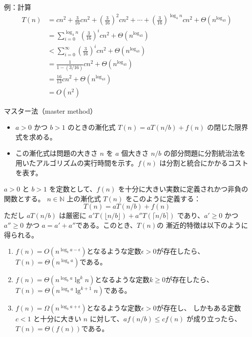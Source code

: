 \documentclass[unicode,11pt,aspectratio=169,notes]{beamer} %
\begin{document}
\begin{frame}{例：計算}
  \begin{align*}
    T(n) & = cn^2 + \frac{3}{16}cn^2 + \left(\frac{3}{16}\right)^2cn^2 + \cdots
             + \left(\frac{3}{16}\right)^{\log_4n}cn^2 + \Theta(n^{\log_43}) \\
         & = \sum_{i=0}^{\log_4n}\left(\frac{3}{16}\right)^icn^2
             + \Theta(n^{\log_43}) \\
         & < \sum_{i=0}^{\infty}\left(\frac{3}{16}\right)^icn^2
             + \Theta(n^{\log_43}) \\
         & = \frac{1}{1-(3/16)}cn^2+\Theta(n^{\log_43}) \\
         & = \frac{16}{13}cn^2+\Theta(n^{\log_43}) \\
         & = O(n^2)
  \end{align*}
\end{frame}


\begin{frame}{マスター法（master method）}
  \begin{itemize}
    \item $a>0$ かつ $b>1$ のときの漸化式 $T(n) = aT(n/b)+f(n)$ の閉じた限界式を求める。
    \item この漸化式は問題の大きさ $n$ を $a$ 個大きさ $n/b$ の部分問題に分割統治法を
    用いたアルゴリズムの実行時間を示す。$f(n)$ は分割と統合にかかるコストを表す。
  \end{itemize}
\end{frame}

\begin{frame}
  \begin{theorem}
    $a>0$ と $b>1$ を定数として、$f(n)$ を十分に大きい実数に定義されかつ非負の関数とする。
    $n\in\mathbb{N}$ 上の漸化式 $T(n)$ をこのように定義する：
    \[
      T(n) = aT(n/b)+f(n)
    \]
    ただし $aT(n/b)$ は厳密に $a'T(\lfloor n/b\rfloor)+a''T(\lceil n/b\rceil)$
    であり、$a'\geq0$ かつ $a''\geq0$ かつ $a=a'+a''$である。このとき、$T(n)$の
    漸近的特徴は以下のように得られる。
    \begin{enumerate}
      \item $f(n)=O(n^{\log_ba-\epsilon})$となるような定数$\epsilon >0$が存在したら、
      $T(n)=\Theta(n^{\log_ba})$である。
      \item $f(n)=\Theta(n^{\log_ba}\lg^kn)$となるような定数$k\geq 0$が存在したら、
      $T(n)=\Theta(n^{\log_ba}\lg^{k+1}n)$である。
      \item $f(n)=\Omega(n^{\log_ba+\epsilon})$となるような定数$\epsilon >0$が存在し、
      しかもある定数 $c<1$ と十分に大きい $n$ に対して、$af(n/b)\leq cf(n)$ が成り立ったら、
      $T(n)=\Theta(f(n))$である。
    \end{enumerate}
  \end{theorem}
\end{frame}
\end{document}
